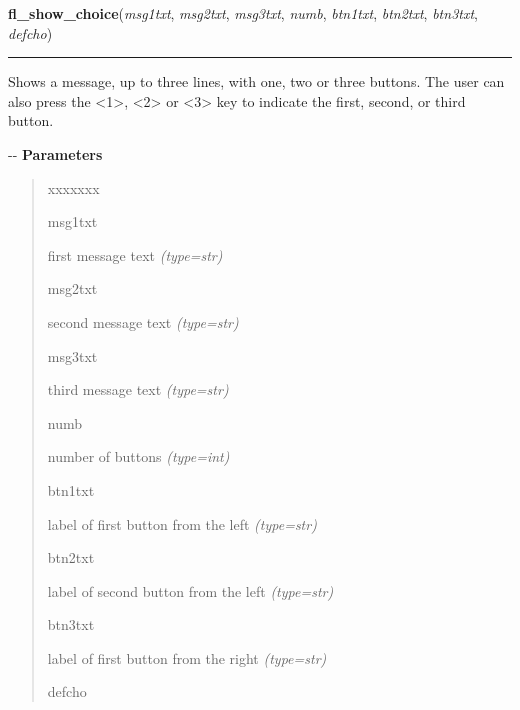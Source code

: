 \hspace{.8\funcindent}\begin{boxedminipage}{\funcwidth}

    \raggedright \textbf{fl\_show\_choice}(\textit{msg1txt}, \textit{msg2txt}, \textit{msg3txt}, \textit{numb}, \textit{btn1txt}, \textit{btn2txt}, \textit{btn3txt}, \textit{defcho})

    \vspace{-1.5ex}

    \rule{\textwidth}{0.5\fboxrule}
\setlength{\parskip}{2ex}

Shows a message, up to three lines, with one, two or three buttons.
The user can also press the <1>, <2> or <3> key to indicate the first,
second, or third button.

-{}-
\setlength{\parskip}{1ex}
      \textbf{Parameters}
      \vspace{-1ex}

      \begin{quote}
        \begin{Ventry}{xxxxxxx}

          \item[msg1txt]


first message text
            {\it (type=str)}

          \item[msg2txt]


second message text
            {\it (type=str)}

          \item[msg3txt]


third message text
            {\it (type=str)}

          \item[numb]


number of buttons
            {\it (type=int)}

          \item[btn1txt]


label of first button from the left
            {\it (type=str)}

          \item[btn2txt]


label of second button from the left
            {\it (type=str)}

          \item[btn3txt]


label of first button from the right
            {\it (type=str)}

          \item[defcho]



\end{Ventry}
\end{quote}
\end{boxedminipage}
